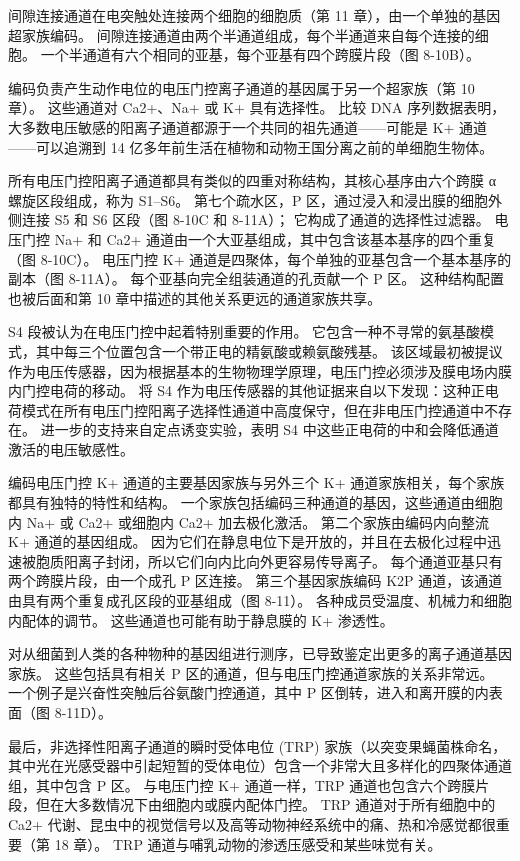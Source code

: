 间隙连接通道在电突触处连接两个细胞的细胞质（第 11 章），由一个单独的基因超家族编码。 间隙连接通道由两个半通道组成，每个半通道来自每个连接的细胞。 一个半通道有六个相同的亚基，每个亚基有四个跨膜片段（图 8-10B）。

编码负责产生动作电位的电压门控离子通道的基因属于另一个超家族（第 10 章）。 这些通道对 Ca2+、Na+ 或 K+ 具有选择性。 比较 DNA 序列数据表明，大多数电压敏感的阳离子通道都源于一个共同的祖先通道——可能是 K+ 通道——可以追溯到 14 亿多年前生活在植物和动物王国分离之前的单细胞生物体。

所有电压门控阳离子通道都具有类似的四重对称结构，其核心基序由六个跨膜 α 螺旋区段组成，称为 S1–S6。 第七个疏水区，P 区，通过浸入和浸出膜的细胞外侧连接 S5 和 S6 区段（图 8-10C 和 8-11A）； 它构成了通道的选择性过滤器。 电压门控 Na+ 和 Ca2+ 通道由一个大亚基组成，其中包含该基本基序的四个重复（图 8-10C）。 电压门控 K+ 通道是四聚体，每个单独的亚基包含一个基本基序的副本（图 8-11A）。 每个亚基向完全组装通道的孔贡献一个 P 区。 这种结构配置也被后面和第 10 章中描述的其他关系更远的通道家族共享。

S4 段被认为在电压门控中起着特别重要的作用。 它包含一种不寻常的氨基酸模式，其中每三个位置包含一个带正电的精氨酸或赖氨酸残基。 该区域最初被提议作为电压传感器，因为根据基本的生物物理学原理，电压门控必须涉及膜电场内膜内门控电荷的移动。 将 S4 作为电压传感器的其他证据来自以下发现：这种正电荷模式在所有电压门控阳离子选择性通道中高度保守，但在非电压门控通道中不存在。 进一步的支持来自定点诱变实验，表明 S4 中这些正电荷的中和会降低通道激活的电压敏感性。

编码电压门控 K+ 通道的主要基因家族与另外三个 K+ 通道家族相关，每个家族都具有独特的特性和结构。 一个家族包括编码三种通道的基因，这些通道由细胞内 Na+ 或 Ca2+ 或细胞内 Ca2+ 加去极化激活。 第二个家族由编码内向整流 K+ 通道的基因组成。 因为它们在静息电位下是开放的，并且在去极化过程中迅速被胞质阳离子封闭，所以它们向内比向外更容易传导离子。 每个通道亚基只有两个跨膜片段，由一个成孔 P 区连接。 第三个基因家族编码 K2P 通道，该通道由具有两个重复成孔区段的亚基组成（图 8-11）。 各种成员受温度、机械力和细胞内配体的调节。 这些通道也可能有助于静息膜的 K+ 渗透性。

对从细菌到人类的各种物种的基因组进行测序，已导致鉴定出更多的离子通道基因家族。 这些包括具有相关 P 区的通道，但与电压门控通道家族的关系非常远。 一个例子是兴奋性突触后谷氨酸门控通道，其中 P 区倒转，进入和离开膜的内表面（图 8-11D）。

最后，非选择性阳离子通道的瞬时受体电位 (TRP) 家族（以突变果蝇菌株命名，其中光在光感受器中引起短暂的受体电位）包含一个非常大且多样化的四聚体通道组，其中包含 P 区。 与电压门控 K+ 通道一样，TRP 通道也包含六个跨膜片段，但在大多数情况下由细胞内或膜内配体门控。 TRP 通道对于所有细胞中的 Ca2+ 代谢、昆虫中的视觉信号以及高等动物神经系统中的痛、热和冷感觉都很重要（第 18 章）。 TRP 通道与哺乳动物的渗透压感受和某些味觉有关。

